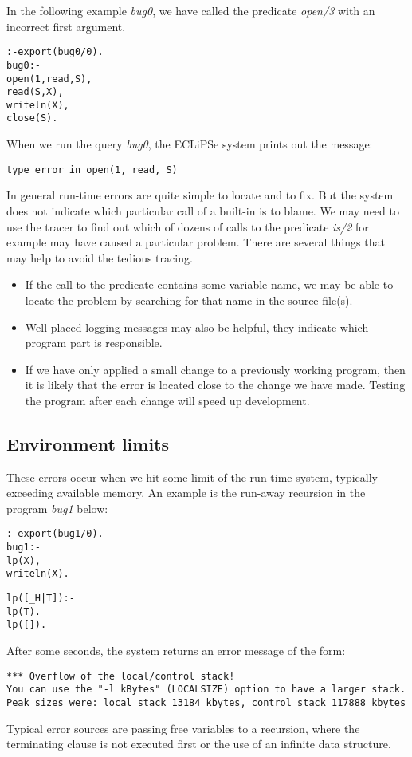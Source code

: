 \documentclass[a4paper,12pt]{report}
\begin{document}
In the following example {\it bug0}, we have called the predicate {\it open/3} with an incorrect first argument.
\pagebreak
\begin{alltt}
:-export(bug0/0).
bug0:-
        open(1,read,S), % wrong
        read(S,X),
        writeln(X),
        close(S).
\end{alltt}

When we run the query {\it bug0}, the ECLiPSe system prints out the message:
\begin{verbatim}
type error in open(1, read, S)
\end{verbatim}
In general run-time errors are quite simple to locate and to fix. But the system does not indicate which particular call of a built-in is to blame. We may need to use the tracer to find out which of dozens of calls to the predicate {\it is/2} for example may have caused a particular problem. There are several things that may help to avoid the tedious tracing. 
\begin{itemize}
\item If the call to the predicate contains some variable name, we may be able to locate the problem by searching for that name in the source file(s). 
\item Well placed logging messages may also be helpful, they indicate which program part is responsible.
\item If we have only applied a small change to a previously working program, then it is likely that the error is located close to the change we have made. Testing the program after each change will speed up development.
\end{itemize} 

\subsection{Environment limits} 
These errors occur when we hit some limit of the run-time system, typically exceeding available memory. An example is the run-away recursion in the program {\it bug1} below:

\begin{alltt}
:-export(bug1/0).
bug1:-
        lp(X),  % wrong
        writeln(X).

lp([_H|T]):-
        lp(T).
lp([]).
\end{alltt}

After some seconds, the system returns an error message of the form:
\begin{footnotesize}
\begin{verbatim}
*** Overflow of the local/control stack!
You can use the "-l kBytes" (LOCALSIZE) option to have a larger stack.
Peak sizes were: local stack 13184 kbytes, control stack 117888 kbytes
\end{verbatim}
\end{footnotesize}
Typical error sources are passing free variables to a recursion, where the terminating clause is not executed first or the use of an infinite data structure.
\end{document}
